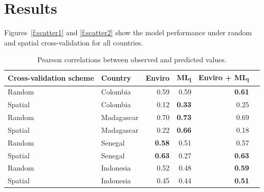 \documentclass[11pt]{article}
\begin{document}
\section{Results}

Figures~\ref{f:scatter1} and \ref{f:scatter2} show the model performance under random and spatial cross-validation for all countries. 




\begin{table}[h!]
\caption{Pearson correlations between observed and predicted values. }
\centering
\begin{tabular}{llrrrr}
Cross-validation scheme & Country &  Enviro &  ML\textsubscript{l} &  Enviro + ML\textsubscript{l} \\
\hline 
 Random &  Colombia & 0.59 & 0.59 & \textbf{0.61} \\
 Spatial &  Colombia &  0.12 &  \textbf{0.33} &  0.25\\
 Random &  Madagascar &  0.70 &  \textbf{0.73} & 0.69 \\
 Spatial &  Madagascar &  0.22 &  \textbf{0.66} & 0.18\\
 Random &  Senegal &  \textbf{0.58} &  0.51 & 0.57 \\
 Spatial &  Senegal &  \textbf{0.63} &  0.27 &  \textbf{0.63} \\
 Random &  Indonesia &  0.52 &  0.48 &  \textbf{0.59} \\
 Spatial &  Indonesia &  0.45 &  0.44 &  \textbf{0.51} \\
\end{tabular}
\label{t:results}
\end{table}
\end{document}
